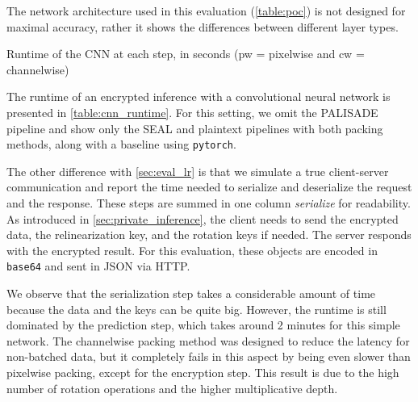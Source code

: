 \documentclass[a4paper,11pt,oneside]{report}
\begin{document}
The network architecture used in this evaluation (\autoref{table:poc}) is not designed for maximal accuracy, rather it shows the differences between different layer types.

\begin{table}[h!]
  \begin{center}
    \caption{Runtime of the CNN at each step, in seconds (pw = pixelwise and cw = channelwise)}
    \label{table:cnn_runtime}
  \end{center}
\end{table}

The runtime of an encrypted inference with a convolutional neural network is presented in \autoref{table:cnn_runtime}. 
For this setting, we omit the PALISADE pipeline and show only the SEAL and plaintext pipelines with both packing methods, along with a baseline using \texttt{pytorch}.

The other difference with \autoref{sec:eval_lr} is that we simulate a true client-server communication and report the time needed to serialize and deserialize the request and the response.
These steps are summed in one column \emph{serialize} for readability.
As introduced in \autoref{sec:private_inference}, the client needs to send the encrypted data, the relinearization key, and the rotation keys if needed.
The server responds with the encrypted result.
For this evaluation, these objects are encoded in \texttt{base64} and sent in JSON via HTTP.

We observe that the serialization step takes a considerable amount of time because the data and the keys can be quite big. 
However, the runtime is still dominated by the prediction step, which takes around 2 minutes for this simple network.
The channelwise packing method was designed to reduce the latency for non-batched data, but it completely fails in this aspect by being even slower than pixelwise packing, except for the encryption step.
This result is due to the high number of rotation operations and the higher multiplicative depth.
\end{document}
